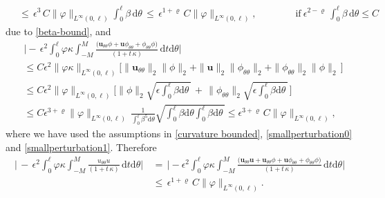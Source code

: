 \documentclass[10pt, reqno]{amsart}
\numberwithin{equation}{section}
\theoremstyle{definition}
\begin{document}
{{\begin{align*}
\nonumber\\[2mm]
 &\,\leq\, \epsilon^3\,C \|\varphi\|_{L^\infty(0,\ell)}\int_0^\ell \beta\,{\mathrm d}\theta
 \,\leq\, \epsilon^{1+\varrho}\,C \|\varphi\|_{L^\infty(0,\ell)} ,\qquad\qquad \mbox{if}\ \epsilon^{2-\varrho}\,\int_0^\ell \beta\,{\mathrm d}\theta\leq C
\end{align*}
 due to \eqref{beta-bound}, and
\begin{align*}
 &\Bigg|-\,\epsilon^2\int_0^\ell \varphi \kappa\int_{-M}^{M}
 \frac{\big({\mathbf u}_{\theta\theta}\phi+{\mathbf u}\phi_{\theta\theta}+\phi_{\theta\theta}\phi\big)} {(1+t\,\kappa)}
 \,{\mathrm d}t{\mathrm d}\theta\Bigg|
\nonumber\\[2mm]
 &\leq
 C\epsilon^2\|\varphi\kappa\|_{L^\infty(0,\ell)}
 \Big[ \|{\mathbf u}_{\theta\theta}\|_2\|\phi\|_2 +\|{\mathbf u}\|_2\|\phi_{\theta\theta}\|_2 +\|\phi_{\theta\theta}\|_2\|\phi\|_2\,\Big]
\nonumber\\[2mm]
 &\leq
 C\epsilon^2\|\varphi\|_{L^\infty(0,\ell)}\Bigg[ \|\phi\|_2\sqrt{\epsilon\int_0^{\ell}\beta {\mathrm d}\theta\,}
 \,+\, \|\phi_{\theta\theta}\|_2 \sqrt{\epsilon\int_0^{\ell}\beta {\mathrm d}\theta\,}
 \,\Bigg]
\nonumber\\[2mm]
 &\leq
 C\epsilon^{3+\varrho}\|\varphi\|_{L^\infty(0,\ell)}\, \frac{1}{\displaystyle\int_0^{\ell}\beta^5 {\mathrm d}\theta}\sqrt{\int_0^{\ell} \beta {\mathrm d}\theta \int_0^{\ell}\beta {\mathrm d}\theta\,}
 \leq
 \epsilon^{3+\varrho}\,C \|\varphi\|_{L^\infty(0,\ell)},
\end{align*}
where we have used the assumptions in \eqref{curvature bounded}, \eqref{smallperturbation0} and \eqref{smallperturbation1}.
Therefore
\begin{align}\label{inedtitiesterm1}
 \Bigg|\,-\,\epsilon^2\int_0^\ell \varphi \kappa\int_{-M}^{M} \frac{u_{\theta\theta} u}{(1+t\,\kappa)}
 \,{\mathrm d}t{\mathrm d}\theta\Bigg|
 &\,=\,
\Bigg|-\epsilon^2\int_0^\ell \varphi \kappa\int_{-M}^{M}
 \frac{ \big({\mathbf u}_{\theta\theta}{\mathbf u} + {\mathbf u}_{\theta\theta}\phi+{\mathbf u}\phi_{\theta\theta}+\phi_{\theta\theta}\phi\big)}{(1+t\,\kappa)}
 \,{\mathrm d}t{\mathrm d}\theta\Bigg|
 \nonumber\\[2mm]
  &\,\leq\, \epsilon^{1+\varrho}\,C \|\varphi\|_{L^\infty(0,\ell)}.
\end{align}


}}
\end{document}
